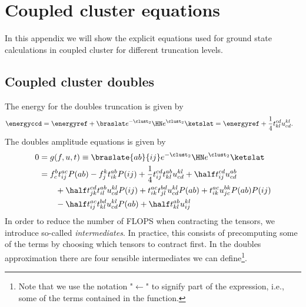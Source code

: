 \chapter{Coupled cluster equations}
    In this appendix we will show the explicit equations used for ground state
    calculations in coupled cluster for different truncation levels.

    \section{Coupled cluster doubles}
        The energy for the doubles truncation is given by
        \begin{align}
            \energyccd
            &= \energyref
            + \braslat e^{-\clust_2}\HN e^{\clust_2}\ketslat
            = \energyref
            + \frac{1}{4}t^{cd}_{kl} u^{kl}_{cd}.
        \end{align}
        The doubles amplitude equations is given by
        \begin{align}
            0 &= g(f, u, t)
            \equiv \braslate{ab}{ij}e^{-\clust_2}\HN e^{\clust_2}\ketslat
            \\
            &=
            f^{b}_{c} t^{ac}_{ij} P(ab)
            - f^{k}_{j} t^{ab}_{ik} P(ij)
            + \frac{1}{4} t^{cd}_{ij} t^{ab}_{kl} u^{kl}_{cd}
            + \half t^{cd}_{ij} u^{ab}_{cd}
            \nonumber \\
            &\qquad
            + \half t^{cd}_{jk} t^{ab}_{il} u^{kl}_{cd} P(ij)
            + t^{ac}_{ik} t^{bd}_{jl} u^{kl}_{cd} P(ab)
            + t^{ac}_{ik} u^{bk}_{jc} P(ab) P(ij)
            \nonumber \\
            &\qquad
            - \half t^{ac}_{ij} t^{bd}_{kl} u^{kl}_{cd} P(ab)
            + \half t^{ab}_{kl} u^{kl}_{ij}
        \end{align}
        In order to reduce the number of FLOPS when contracting the tensors, we
        introduce so-called \emph{intermediates}\cite{hjorth2017advanced}. In
        practice, this consists of precomputing some of the terms by choosing
        which tensors to contract first. In the doubles approximation there are
        four sensible intermediates we can define\footnote{Note that we use the
        notation "$\gets$" to signify part of the expression, i.e., some of the
        terms contained in the function.}.
